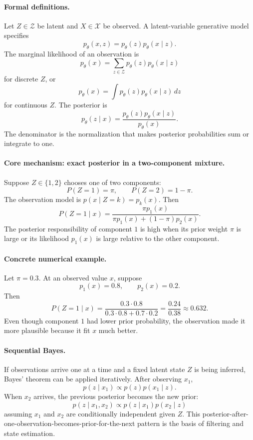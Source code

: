 \paragraph{Formal definitions.}
Let \(Z\in\mathcal Z\) be latent and \(X\in\mathcal X\) be observed. A latent-variable generative model specifies
\[
\boxed{
p_\theta(x,z)=p_\theta(z)p_\theta(x\mid z).
}
\]
The marginal likelihood of an observation is
\[
\boxed{
p_\theta(x)=\sum_{z\in\mathcal Z}p_\theta(z)p_\theta(x\mid z)
}
\]
for discrete \(Z\), or
\[
p_\theta(x)=\int p_\theta(z)p_\theta(x\mid z)\,dz
\]
for continuous \(Z\). The posterior is
\[
\boxed{
p_\theta(z\mid x)=\frac{p_\theta(z)p_\theta(x\mid z)}{p_\theta(x)}.
}
\]
The denominator is the normalization that makes posterior probabilities sum or integrate to one.

\paragraph{Core mechanism: exact posterior in a two-component mixture.}
Suppose \(Z\in\{1,2\}\) chooses one of two components:
\[
P(Z=1)=\pi,\qquad P(Z=2)=1-\pi.
\]
The observation model is \(p(x\mid Z=k)=p_k(x)\). Then
\[
P(Z=1\mid x)
=
\frac{\pi p_1(x)}{\pi p_1(x)+(1-\pi)p_2(x)}.
\]
The posterior responsibility of component \(1\) is high when its prior weight \(\pi\) is large or its likelihood \(p_1(x)\) is large relative to the other component.

\paragraph{Concrete numerical example.}
Let \(\pi=0.3\). At an observed value \(x\), suppose
\[
p_1(x)=0.8,\qquad p_2(x)=0.2.
\]
Then
\[
P(Z=1\mid x)
=\frac{0.3\cdot0.8}{0.3\cdot0.8+0.7\cdot0.2}
=\frac{0.24}{0.38}
\approx0.632.
\]
Even though component \(1\) had lower prior probability, the observation made it more plausible because it fit \(x\) much better.

\paragraph{Sequential Bayes.}
If observations arrive one at a time and a fixed latent state \(Z\) is being inferred, Bayes' theorem can be applied iteratively. After observing \(x_1\),
\[
p(z\mid x_1)\propto p(z)p(x_1\mid z).
\]
When \(x_2\) arrives, the previous posterior becomes the new prior:
\[
\boxed{
p(z\mid x_1,x_2)
\propto
p(z\mid x_1)p(x_2\mid z)
}
\]
assuming \(x_1\) and \(x_2\) are conditionally independent given \(Z\). This posterior-after-one-observation-becomes-prior-for-the-next pattern is the basis of filtering and state estimation.

